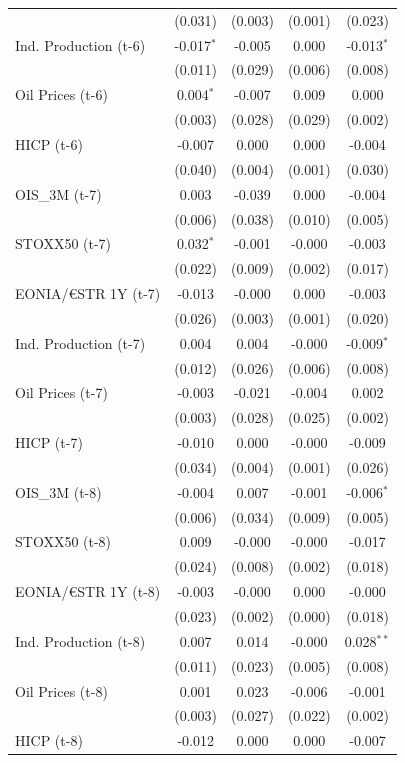\begin{longtable}[t]{lcccc}
 & (0.031) & (0.003) & (0.001) & (0.023)\\
Ind. Production (t-6) & -0.017$^{*}$ & -0.005 & 0.000 & -0.013$^{*}$\\
 & (0.011) & (0.029) & (0.006) & (0.008)\\
Oil Prices (t-6) & 0.004$^{*}$ & -0.007 & 0.009 & 0.000\\
 & (0.003) & (0.028) & (0.029) & (0.002)\\
HICP (t-6) & -0.007 & 0.000 & 0.000 & -0.004\\
 & (0.040) & (0.004) & (0.001) & (0.030)\\
OIS\_3M (t-7) & 0.003 & -0.039 & 0.000 & -0.004\\
 & (0.006) & (0.038) & (0.010) & (0.005)\\
STOXX50 (t-7) & 0.032$^{*}$ & -0.001 & -0.000 & -0.003\\
 & (0.022) & (0.009) & (0.002) & (0.017)\\
EONIA/€STR 1Y (t-7) & -0.013 & -0.000 & 0.000 & -0.003\\
 & (0.026) & (0.003) & (0.001) & (0.020)\\
Ind. Production (t-7) & 0.004 & 0.004 & -0.000 & -0.009$^{*}$\\
 & (0.012) & (0.026) & (0.006) & (0.008)\\
Oil Prices (t-7) & -0.003 & -0.021 & -0.004 & 0.002\\
 & (0.003) & (0.028) & (0.025) & (0.002)\\
HICP (t-7) & -0.010 & 0.000 & -0.000 & -0.009\\
 & (0.034) & (0.004) & (0.001) & (0.026)\\
OIS\_3M (t-8) & -0.004 & 0.007 & -0.001 & -0.006$^{*}$\\
 & (0.006) & (0.034) & (0.009) & (0.005)\\
STOXX50 (t-8) & 0.009 & -0.000 & -0.000 & -0.017\\
 & (0.024) & (0.008) & (0.002) & (0.018)\\
EONIA/€STR 1Y (t-8) & -0.003 & -0.000 & 0.000 & -0.000\\
 & (0.023) & (0.002) & (0.000) & (0.018)\\
Ind. Production (t-8) & 0.007 & 0.014 & -0.000 & 0.028$^{**}$\\
 & (0.011) & (0.023) & (0.005) & (0.008)\\
Oil Prices (t-8) & 0.001 & 0.023 & -0.006 & -0.001\\
 & (0.003) & (0.027) & (0.022) & (0.002)\\
HICP (t-8) & -0.012 & 0.000 & 0.000 & -0.007\\

\end{longtable}
